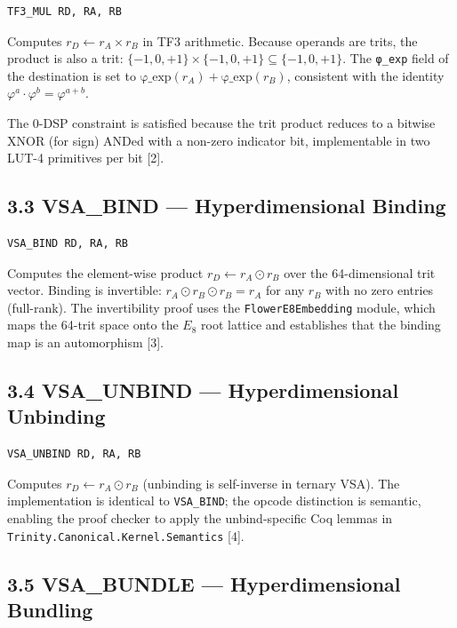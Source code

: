 \begin{verbatim}
TF3_MUL RD, RA, RB
\end{verbatim}

Computes \(r_D \leftarrow r_A \times r_B\) in TF3
arithmetic. Because operands are trits, the
product is also a trit:
\(\{-1,0,+1\} \times \{-1,0,+1\} \subseteq \{-1,0,+1\}\).
The \texttt{φ\_exp} field of the destination is
set to
\(\text{φ\_exp}(r_A) + \text{φ\_exp}(r_B)\),
consistent with the identity
\(\varphi^a \cdot \varphi^b = \varphi^{a+b}\).

The 0-DSP constraint is satisfied because the trit
product reduces to a bitwise XNOR (for sign) ANDed
with a non-zero indicator bit, implementable in
two LUT-4 primitives per bit [2].

\subsection{3.3 VSA\_BIND --- Hyperdimensional
Binding}\label{fa_26:vsa_bind-hyperdimensional-binding}

\begin{verbatim}
VSA_BIND RD, RA, RB
\end{verbatim}

Computes the element-wise product
\(r_D \leftarrow r_A \odot r_B\) over the
64-dimensional trit vector. Binding is invertible:
\(r_A \odot r_B \odot r_B = r_A\) for any \(r_B\)
with no zero entries (full-rank). The
invertibility proof uses the
\texttt{FlowerE8Embedding} module, which maps the
64-trit space onto the \(E_8\) root lattice and
establishes that the binding map is an
automorphism [3].

\subsection{3.4 VSA\_UNBIND ---
Hyperdimensional
Unbinding}\label{fa_26:vsa_unbind-hyperdimensional-unbinding}

\begin{verbatim}
VSA_UNBIND RD, RA, RB
\end{verbatim}

Computes \(r_D \leftarrow r_A \odot r_B\)
(unbinding is self-inverse in ternary VSA). The
implementation is identical to \texttt{VSA\_BIND};
the opcode distinction is semantic, enabling the
proof checker to apply the unbind-specific Coq
lemmas in
\texttt{Trinity.Canonical.Kernel.Semantics}
[4].

\subsection{3.5 VSA\_BUNDLE ---
Hyperdimensional
Bundling}\label{fa_26:vsa_bundle-hyperdimensional-bundling}

